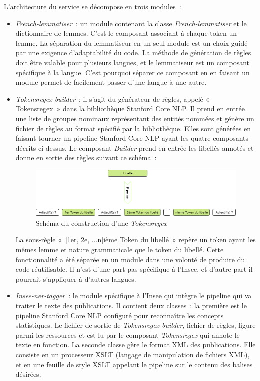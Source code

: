 L'architecture du service se décompose en trois modules~: 
\begin{itemize}
    \item \textit{French-lemmatiser}~: un module contenant la classe \textit{French-lemmatiser} et le dictionnaire de lemmes. C'est le composant associant à chaque token un lemme. La séparation du lemmatiseur en un seul module est un choix guidé par une exigence d'adaptabilité du code. La méthode de génération de règles doit être valable pour plusieurs langues, et le lemmatiseur est un composant spécifique à la langue. C'est pourquoi séparer ce composant en en faisant un module permet de facilement passer d'une langue à une autre.
    \vspace{5pt}
    \item \textit{Tokensregex-builder}~: il s'agit du générateur de règles, appelé «~ Tokensregex~» dans la bibliothèque Stanford Core NLP. Il prend en entrée une liste de groupes nominaux représentant des entités nommées et génère un fichier de règles au format spécifié par la bibliothèque. Elles sont générées en faisant tourner un pipeline Stanford Core NLP ayant les quatre composants décrits ci-dessus. Le composant \textit{Builder} prend en entrée les libellés annotés et donne en sortie des règles suivant ce schéma~: 
    \vspace{10pt}
    \begin{figure}[H]
        \centering
        \includegraphics[scale=0.6]{images/Exemple-tokensregex.png}
        \caption{Schéma du construction d'une \textit{Tokensregex}}
        \label{fig:schema-tokensregex}
    \end{figure}
    \vspace{10pt}
    La sous-règle «~[1er, 2e, ...n]ième Token du libellé~» repère un token ayant les mêmes lemme et nature grammaticale que le token du libellé. Cette fonctionnalité a été séparée en un module dans une volonté de produire du code réutilisable. Il n'est d'une part pas spécifique à l'Insee, et d'autre part il pourrait s'appliquer à d'autres langues.
    \vspace{5pt}
    \item \textit{Insee-ner-tagger}~: le module spécifique à l'Insee qui intègre le pipeline qui va traiter le texte des publications. Il contient deux classes~: la première est le pipeline Stanford Core NLP configuré pour reconnaître les concepts statistiques. Le fichier de sortie de \textit{Tokensregex-builder}, fichier de règles, figure parmi les ressources et est lu par le composant \textit{Tokensregex} qui annote le texte en fonction. La seconde classe gère le format XML des publications. Elle consiste en un processeur XSLT (langage de manipulation de fichiers XML), et en une feuille de style XSLT appelant le pipeline sur le contenu des balises désirées.
    \newline
\end{itemize}

